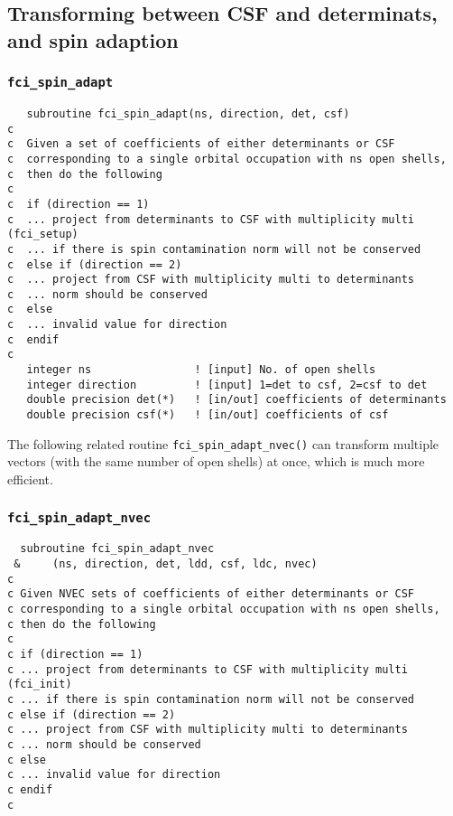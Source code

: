 \subsection{Transforming between CSF and determinats, and spin adaption}

\subsubsection{{\tt fci\_spin\_adapt}}
\label{spinad1}
\begin{verbatim}
   subroutine fci_spin_adapt(ns, direction, det, csf)
c     
c  Given a set of coefficients of either determinants or CSF
c  corresponding to a single orbital occupation with ns open shells,
c  then do the following
c     
c  if (direction == 1)
c  ... project from determinants to CSF with multiplicity multi (fci_setup)
c  ... if there is spin contamination norm will not be conserved
c  else if (direction == 2)
c  ... project from CSF with multiplicity multi to determinants
c  ... norm should be conserved
c  else
c  ... invalid value for direction
c  endif
c     
   integer ns                ! [input] No. of open shells
   integer direction         ! [input] 1=det to csf, 2=csf to det
   double precision det(*)   ! [in/out] coefficients of determinants
   double precision csf(*)   ! [in/out] coefficients of csf
\end{verbatim}

The following related routine \verb+fci_spin_adapt_nvec()+ can
transform multiple vectors (with the same number of open shells) at
once, which is much more efficient.

\subsubsection{{\tt fci\_spin\_adapt\_nvec}}
\begin{verbatim}
  subroutine fci_spin_adapt_nvec
 &     (ns, direction, det, ldd, csf, ldc, nvec)
c     
c Given NVEC sets of coefficients of either determinants or CSF
c corresponding to a single orbital occupation with ns open shells,
c then do the following
c   
c if (direction == 1)
c ... project from determinants to CSF with multiplicity multi (fci_init)
c ... if there is spin contamination norm will not be conserved
c else if (direction == 2)
c ... project from CSF with multiplicity multi to determinants
c ... norm should be conserved
c else
c ... invalid value for direction
c endif
c     
\end{verbatim}

